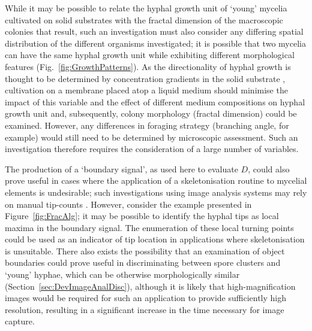 While it may be possible to relate the hyphal growth unit of \lq young' mycelia cultivated on solid substrates with the fractal dimension of the macroscopic colonies that result, such an investigation must also consider any differing spatial distribution of the different organisms investigated; it is possible that two mycelia can have the same hyphal growth unit while exhibiting different morphological features (Fig.~\ref{fig:GrowthPatterns}). As the directionality of hyphal growth is thought to be determined by concentration gradients in the solid substrate \cite{prosser1995,carlile2001}, cultivation on a membrane placed atop a liquid medium should minimise the impact of this variable and the effect of different medium compositions on hyphal growth unit and, subsequently, colony morphology (fractal dimension) could be examined. However, any differences in foraging strategy (branching angle, for example) would still need to be determined by microscopic assessment. Such an investigation therefore requires the consideration of a large number of variables.

The production of a \lq boundary signal', as used here to evaluate $D$, could also prove useful in cases where the application of a skeletonisation routine to mycelial elements is undesirable; such investigations using image analysis systems may rely on manual tip-counts \cite{muller2003}. However, consider the example presented in Figure~\ref{fig:FracAlg}; it may be possible to identify the hyphal tips as local maxima in the boundary signal. The enumeration of these local turning points could be used as an indicator of tip location in applications where skeletonisation is unsuitable. There also exists the possibility that an examination of object boundaries could prove useful in discriminating between spore clusters and \lq young' hyphae, which can be otherwise morphologically similar (Section~\ref{sec:DevImageAnalDisc}), although it is likely that high-magnification images would be required for such an application to provide sufficiently high resolution, resulting in a significant increase in the time necessary for image capture.


